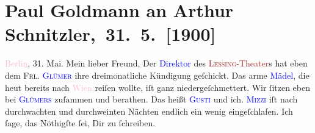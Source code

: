 

         
         \renewcommand{\erwaehntePersonen}{Personen: Auguste Chlum, Marie Glümer, Gilbert Otto Neumann-Hofer}
         \renewcommand{\erwaehnteInstitutionen}{Institutionen: Lessing-Theater}
         \renewcommand{\erwaehnteOrte}{Orte: Berlin, Wien}
         \renewcommand{\erwaehnteWerke}{}
               \section[ Paul Goldmann an Arthur Schnitzler, 31. 5. {[}1900{]}]{Paul Goldmann an Arthur Schnitzler, 31. 5. {[}1900{]}}\nopagebreak{}\rehead{ }\normalsize\beginnumbering{} \toendnotes[C]{\smallbreak\pagebreak[2]} 
\toendnotes[C]{\smallbreak}\pstart
           \raggedleft{}{\pb}\textcolor{pink}{Berlin}{}\ledrightnote{\textcolor{pink}{Berlin}}, 31.
                  Mai.\pend
           \pstart\center{}Mein lieber Freund,\pend\pstart
           Der \textcolor{blue}{Direktor}{}\ledrightnote{{$\rightarrow$}\textcolor{blue}{Gilbert Otto Neumann-Hofer}} des \textcolor{brown}{\textsc{Lessing}-Theater}{}\ledrightnote{\textcolor{brown}{Lessing-Theater}}s hat eben dem \textsc{Frl. \textcolor{blue}{Glümer}{}\ledrightnote{\textcolor{blue}{Marie Glümer}}} ihre dreimonatliche Kündigung geſchickt. Das arme \textcolor{blue}{Mädel}{}\ledrightnote{{$\rightarrow$}\textcolor{blue}{Marie Glümer}}, die heut bereits nach \textcolor{pink}{Wien}{}\ledrightnote{\textcolor{pink}{Wien}} reiſen wollte,
               iſt ganz niedergeſchmettert. Wir ſitzen eben bei \textsc{\textcolor{blue}{Glümers}{}\ledrightnote{{$\rightarrow$}\textcolor{blue}{Marie Glümer}{\newline}{$\rightarrow$}\textcolor{blue}{Auguste Chlum}}} zuſammen und berathen. Das heißt \textsc{\textcolor{blue}{Gusti}{}\ledrightnote{\textcolor{blue}{Auguste Chlum}}} und ich. \textsc{\textcolor{blue}{Mizzi}{}\ledrightnote{\textcolor{blue}{Marie Glümer}}} iſt nach durchwachten und durchweinten Nächten endlich ein wenig eingeſchlafen.
               Ich ſage, das Nöthigſte ſei, Dir zu {\pb}ſchreiben.
